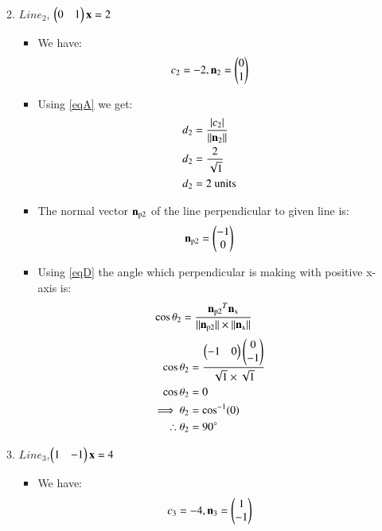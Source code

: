 \documentclass[journal,12pt,twocolumn]{IEEEtran}
\begin{document}
\begin{enumerate}
\begin{enumerate}[label=\alph*.]
\begin{itemize}
\begin{align}
\end{align}
\end{itemize}
\item $Line_2$, $\myvec{0&1}\vec{x} =2$
\begin{itemize}
\item We have:
\begin{align}
 c\textsubscript{2}=-2 ,{\vec{n\textsubscript{2}}}=\myvec{0\\1}   
\end{align}
\item Using \eqref{eqA} we get:
\begin{align}
d\textsubscript{2}&=\frac { \left| c\textsubscript{2} \right| }{\norm{\vec{n\textsubscript{2}}}}
\\
d\textsubscript{2}&=\frac{2}{\sqrt{1}} 
\\
d\textsubscript{2}&=2 \text{ units}
\end{align}
\item The normal vector $\vec{n\textsubscript{p2}}$ of the line perpendicular to given line is: 
\begin{align}
    \vec{n\textsubscript{p2}}=\myvec{-1\\0}
\end{align}
\item Using \eqref{eqD} the angle which perpendicular is making with positive x-axis is:
\begin{align}
   \cos\theta\textsubscript{2} &= \frac{\vec{n\textsubscript{p2}}^T\vec{n\textsubscript{x}}}{\norm{\vec{n\textsubscript{p2}}}\times\norm{\vec{n\textsubscript{x}}}}
    \end{align}
    \begin{align}
   \cos\theta\textsubscript{2} &= \frac{\myvec{-1&0}\myvec{0\\-1}}{\sqrt{1}\times\sqrt{1}}
    \\
 \cos\theta\textsubscript{2} &= 0
 \\
 \implies \theta\textsubscript{2}&=\cos^{-1}(0)
 \\
 \therefore  \theta\textsubscript{2}&=90\degree
\end{align}
\end{itemize}
\item 
$Line_3$,$\myvec{1&-1}\vec{x} =4$
\begin{itemize}
\item We have:
\begin{align}
 c\textsubscript{3}= -4 ,{\vec{n\textsubscript{3}}}=\myvec{1\\-1}   
\end{align}

\end{itemize}
\end{enumerate}
\end{enumerate}
\end{document}
